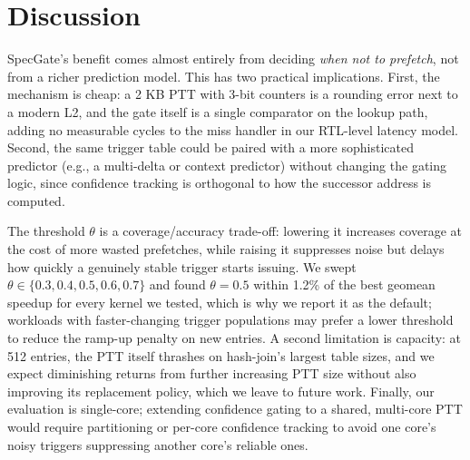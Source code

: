 \section{Discussion}
SpecGate's benefit comes almost entirely from deciding \emph{when not to prefetch}, not from a richer prediction model. This has two practical implications. First, the mechanism is cheap: a 2 KB PTT with 3-bit counters is a rounding error next to a modern L2, and the gate itself is a single comparator on the lookup path, adding no measurable cycles to the miss handler in our RTL-level latency model. Second, the same trigger table could be paired with a more sophisticated predictor (e.g., a multi-delta or context predictor) without changing the gating logic, since confidence tracking is orthogonal to how the successor address is computed.

The threshold $\theta$ is a coverage/accuracy trade-off: lowering it increases coverage at the cost of more wasted prefetches, while raising it suppresses noise but delays how quickly a genuinely stable trigger starts issuing. We swept $\theta \in \{0.3, 0.4, 0.5, 0.6, 0.7\}$ and found $\theta = 0.5$ within 1.2\% of the best geomean speedup for every kernel we tested, which is why we report it as the default; workloads with faster-changing trigger populations may prefer a lower threshold to reduce the ramp-up penalty on new entries. A second limitation is capacity: at 512 entries, the PTT itself thrashes on hash-join's largest table sizes, and we expect diminishing returns from further increasing PTT size without also improving its replacement policy, which we leave to future work. Finally, our evaluation is single-core; extending confidence gating to a shared, multi-core PTT would require partitioning or per-core confidence tracking to avoid one core's noisy triggers suppressing another core's reliable ones.
